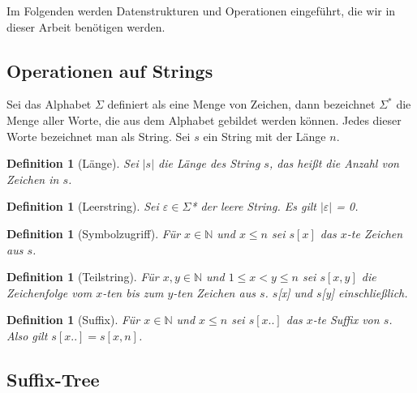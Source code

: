 \documentclass[a4paper,11pt]{scrartcl}%
\theoremstyle{change}
\theoremstyle{nonumberplain}
\theoremstyle{change}
\newtheorem{definition}[theorem]{Definition}
\theoremstyle{nonumberplain}
\theoremstyle{change}
\theoremstyle{nonumberplain}
\begin{document}
Im Folgenden werden Datenstrukturen und Operationen eingeführt, die wir in dieser Arbeit benötigen werden.

\subsection{Operationen auf Strings}

Sei das Alphabet $\Sigma$ definiert als eine Menge von Zeichen, dann bezeichnet $\Sigma^{*}$ die Menge aller Worte, die aus dem Alphabet gebildet werden können. Jedes dieser Worte bezeichnet man als String.
	Sei $s$ ein String mit der Länge $n$.
	
	\begin{definition}[Länge]
		Sei $|s|$ die Länge des String $s$, das heißt die Anzahl von Zeichen in $s$.
	\end{definition}
	
	\begin{definition}[Leerstring]
		Sei $\varepsilon \in \Sigma$* der leere String. Es gilt $|\varepsilon|$ = 0.
	\end{definition}
	
	\begin{definition}[Symbolzugriff]
		Für $x \in \mathbb{N}$ und $x \leq n$ sei $s[x]$ das $x$-te Zeichen aus $s$.
	\end{definition}
	
	\begin{definition}[Teilstring]
		Für $x,y \in \mathbb{N}$ und $1 \leq x < y \leq n$ sei $s[x,y]$ die Zeichenfolge vom $x$-ten bis zum $y$-ten Zeichen aus $s$. $s$[x] und $s$[y] einschließlich.
	\end{definition}
	
	\begin{definition}[Suffix]
		 Für $x \in \mathbb{N}$ und $x \leq n$ sei $s[x..]$ das $x$-te Suffix von $s$. Also gilt $s[x..] = s[x,n]$.
	\end{definition}
	
\subsection{Suffix-Tree}
\end{document}
